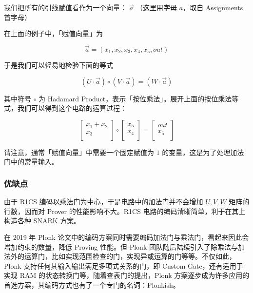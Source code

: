

我们把所有的引线赋值看作为一个向量： \(\vec{a}\) （这里用字母
\(a\)，取自 Assignments 首字母）

在上面的例子中，「赋值向量」为

\[
\vec{a} = (x_1, x_2, x_3,x_4,x_5,out)
\]

于是我们可以轻易地检验下面的等式

\[
(U \cdot \vec{a}) \circ (V \cdot \vec{a}) = (W \cdot\vec{a})
\]

其中符号 \(\circ\) 为 Hadamard
Product，表示「按位乘法」。展开上面的按位乘法等式，我们可以得到这个电路的运算过程：

\[
\left[
\begin{array}{c}
x_1 + x_2 \\
x_3 \\
\end{array}
\right]
\circ
\left[
\begin{array}{c}
x_5 \\
x_4 \\
\end{array}
\right]=
\left[
\begin{array}{c}
out \\
x_5 \\
\end{array}
\right]
\]

请注意，通常「赋值向量」中需要一个固定赋值为 \(1\)
的变量，这是为了处理加法门中的常量输入。

\hypertarget{ux4f18ux7f3aux70b9}{%
\subsubsection{优缺点}\label{ux4f18ux7f3aux70b9}}

由于 R1CS 编码以乘法门为中心，于是电路中的加法门并不会增加 \(U, V, W\)
矩阵的行数，因而对 Prover 的性能影响不大。R1CS
电路的编码清晰简单，利于在其上构造各种 SNARK 方案。

在 2019 年 Plonk
论文中的编码方案同时需要编码加法门与乘法门，看起来因此会增加约束的数量，降低
Proving 性能。但 Plonk
团队随后陆续引入了除乘法与加法外的运算门，比如实现范围检查的门，实现异或运算的门等等。不仅如此，Plonk
支持任何其输入输出满足多项式关系的门，即 Custom Gate，还有适用于实现 RAM
的状态转换门等，随着查表门的提出，Plonk
方案逐步成为许多应用的首选方案，其编码方式也有了一个专门的名词：Plonkish。

